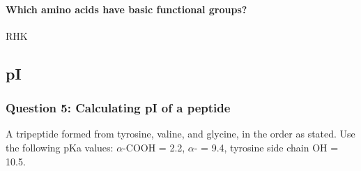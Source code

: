 \documentclass[letterpaper, 12pt]{article}
\begin{document}
\paragraph{Which amino acids have basic functional groups?} RHK

\subsection*{pI}

\subsubsection*{Question 5: Calculating pI of a peptide}

A tripeptide formed from tyrosine, valine, and glycine, in the order as stated. Use the following pKa values: $\alpha$-COOH = 2.2, $\alpha$- = 9.4, tyrosine side chain OH = 10.5.
\end{document}
